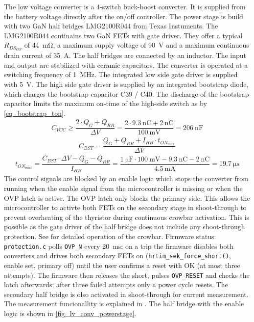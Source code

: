 The low voltage converter is a 4-switch buck-boost converter. It is supplied from the battery voltage directly after the on/off controller. The power stage is build with two \ac{GaN} half bridges LMG2100R044 from Texas Instuments. The LMG2100R044 continains two \ac{GaN} \acp{FET} with gate driver. They offer a typical $R_{DS_{ON}}$ of \qty{44}{\milli\ohm}, a maximum supply voltage of \qty{90}{\volt} and a maximum continuous drain current of \qty{35}{\ampere}. The half bridges are connected by an inductor. The input and output are stabilized with ceramic capacitors. The converter is operated at a switching frequency of \qty{1}{\mega\hertz}. 
The integrated low side gate driver is supplied with \qty{5}{\volt}. The high side gate driver is supplied by an integrated bootstrap diode, which charges the bootstrap capacitor C39 / C40. The discharge of the bootstrap capacitor limits the maximum on-time of the high-side switch as by \autoref{eq_bootstrap_ton}. 
\begin{align}
    \label{eq_lv_conv_sup_bypass}
    C_{VCC} 
    \geq \dfrac{2 \cdot Q_{G} + Q_{RR}}{\Delta V} 
    = \dfrac{2 \cdot \qty{9.3}{\nano\coulomb} + \qty{2}{\nano\coulomb}}{\qty{100}{\milli\volt}} 
    = \qty{206}{\nano\farad}
\end{align}
\begin{align}
    \label{eq_bootstrap}
    C_{BST} = \dfrac{Q_{G} + Q_{RR} + I_{HB} \cdot t_{ON_{max}}}{\Delta V}
\end{align}
\begin{align}
    \label{eq_bootstrap}
    t_{ON_{max}} 
    = \dfrac{C_{BST} \cdot \Delta V - Q_{G} - Q_{RR}}{I_{HB}}
    = \dfrac{\qty{1}{\micro\farad} \cdot \qty{100}{\milli\volt} - \qty{9.3}{\nano\coulomb} - \qty{2}{\nano\coulomb}}{\qty{4.5}{\milli\ampere}}
    = \qty{19.7}{\micro\second}
\end{align}
The control signals are blocked by an enable logic which stops the converter from running when the enable signal from the microcontroller is missing or when the \ac{OVP} latch is active. The \ac{OVP} latch only blocks the primary side. This allows the microcontroller to activte both \acp{FET} on the secondary stage in shoot-through to prevent overheating of the thyristor during continuous crowbar activation. This is possible as the gate driver of the half bridge does not include any shoot-through protection. See  for detailed operation of the crowbar. Firmware status: \texttt{protection.c} polls \texttt{OVP\_N} every \qty{20}{\milli\second}; on a trip the firmware disables both converters and drives both secondary \acp{FET} on (\texttt{hrtim\_sek\_force\_short()}, enable set, primary off) until the user confirms a reset with OK (at most three attempts). The firmware then releases the short, pulses \texttt{OVP\_RESET} and checks the latch afterwards; after three failed attempts only a power cycle resets. The secondary half bridge is olso activated in shoot-through for current measurement. The measurement funcionallity is explained in . The half bridge with the enable logic is shown in \autoref{fig_lv_conv_powerstage}. 

